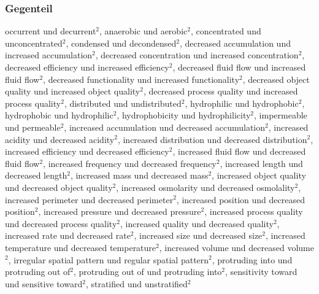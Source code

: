 \subsubsection{Gegenteil}
occurrent und decurrent$^2$, anaerobic und aerobic$^2$, concentrated und
unconcentrated$^2$, condensed und decondensed$^2$, decreased accumulation und
increased accumulation$^2$, decreased concentration und increased
concentration$^2$, decreased efficiency und increased efficiency$^2$, decreased
fluid flow und increased fluid flow$^2$, decreased functionality und increased
functionality$^2$, decreased object quality und increased object quality$^2$,
decreased process quality und increased process quality$^2$, distributed und
undistributed$^2$, hydrophilic und hydrophobic$^2$, hydrophobic und hydrophilic$^2$,
hydrophobicity und hydrophilicity$^2$, impermeable und permeable$^2$, increased
accumulation und decreased accumulation$^2$, increased acidity und decreased
acidity$^2$, increased distribution und decreased distribution$^2$, increased
efficiency und decreased efficiency$^2$, increased fluid flow und decreased fluid
flow$^2$, increased frequency und decreased frequency$^2$, increased length und
decreased length$^2$, increased mass und decreased mass$^2$, increased object
quality und decreased object quality$^2$, increased osmolarity und decreased
osmolality$^2$, increased perimeter und decreased perimeter$^2$, increased
position und decreased position$^2$, increased pressure und decreased pressure$^2$,
increased process quality und decreased process quality$^2$, increased quality und
decreased quality$^2$, increased rate und decreased rate$^2$, increased size und
decreased size$^2$, increased temperature und decreased temperature$^2$, increased
volume und decreased volume$^2$, irregular spatial pattern und regular spatial
pattern$^2$, protruding into und protruding out of$^2$, protruding out of und
protruding into$^2$, sensitivity toward und sensitive toward$^2$, stratified und
unstratified$^2$


